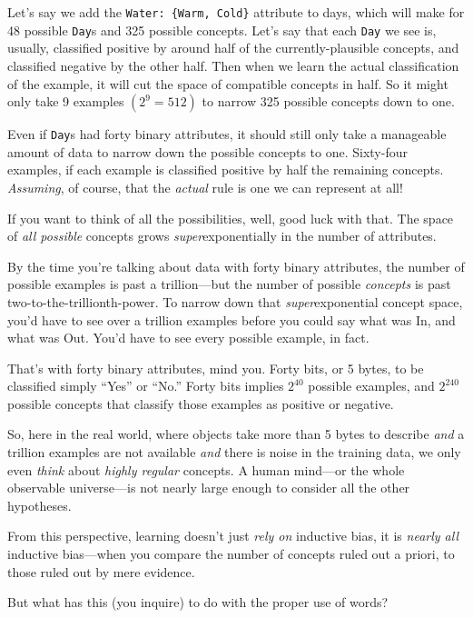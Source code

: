 {
  Let's say we add the \texttt{Water: \{Warm, Cold\}}
  attribute to days, which will
make for 48 possible \texttt{Day}s and 325 possible concepts.
Let's say that each \texttt{Day} we see is, usually, classified
positive by around half of the currently-plausible concepts, and
classified negative by the other half. Then when we learn the actual
classification of the example, it will cut the space of compatible
concepts in half. So it might only take 9 examples
$(2^9 = 512)$ to narrow 325 possible concepts down to
one.}

{
 Even if \texttt{Day}s had forty binary attributes, it should still only
take a manageable amount of data to narrow down the possible concepts
to one. Sixty-four examples, if each example is classified positive by
half the remaining concepts. \textit{Assuming}, of course, that the
\textit{actual} rule is one we can represent at all!}

{
 If you want to think of all the possibilities, well, good luck
with that. The space of \textit{all possible} concepts grows
\textit{super}exponentially in the number of attributes.}

{
 By the time you're talking about data with forty
binary attributes, the number of possible examples is past a
trillion---but the number of possible \textit{concepts} is past
two-to-the-trillionth-power. To narrow down that
\textit{super}exponential concept space, you'd have to
see over a trillion examples before you could say what was In, and what
was Out. You'd have to see every possible example, in
fact.}

{
 That's with forty binary attributes, mind you.
Forty bits, or 5 bytes, to be classified simply
``Yes'' or
``No.'' Forty bits implies
$2^{40}$ possible examples, and $2^{240}$
possible concepts that classify those examples as positive or
negative.}

{
 So, here in the real world, where objects take more than 5 bytes
to describe \textit{and} a trillion examples are not available
\textit{and} there is noise in the training data, we only even
\textit{think} about \textit{highly regular} concepts. A human
mind---or the whole observable universe---is not nearly large enough to
consider all the other hypotheses.}

{
 From this perspective, learning doesn't just
\textit{rely on} inductive bias, it is \textit{nearly all} inductive
bias---when you compare the number of concepts ruled out a priori, to
those ruled out by mere evidence.}

{
 But what has this (you inquire) to do with the proper use of
words?}


